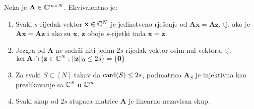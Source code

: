 \documentclass[a4paper,twoside,12pt]{memoir} %
\newcommand{\vect}[1]{\mathbf{#1}}
\renewcommand{\vec}{\vect}
\newcommand{\card}{\text{\normalfont{card}}}
\newcommand{\norm}[1]{\|{#1}\|}
\begin{document}
\begin{thm} \label{rekonstrukcija_tm1}
    Neka je $\vec A \in \C^{m \times N}$. Ekvivalentno je:
    \begin{enumerate}[label=(\alph*)]
        \item Svaki $s$-rijedak vektor $\vec x \in \C^N$ je jedinstveno rje\v{s}enje od $\vec{Ax}=\vec{Az}$, tj. ako je $\vec{Ax}=\vec{Az}$ i ako su $\vec x$, $\vec z$ oboje $s$-rijetki tada $\vec x = \vec z$.
        \item Jezgra od $\vec A$ ne sadr\v{z}i niti jedan $2s$-rijedak vektor osim nul-vektora, tj. $\ker \vec A \cap \{\vec z \in \C^N: \norm{\vec z}_0 \leq 2s\} = \{\vec 0\}$
        \item Za svaki $S \subset [N]$ takav da $\card(S) \leq 2s$, podmatrica $\vec A_S$ je injektivna kao preslikavanje sa $\mathbb{C}^S$ u $\mathbb{C}^m$.
        \item Svaki skup od $2s$ stupaca matrice $\vec A$ je linearno nezavisan skup.
    \end{enumerate}
\end{thm}
\end{document}
